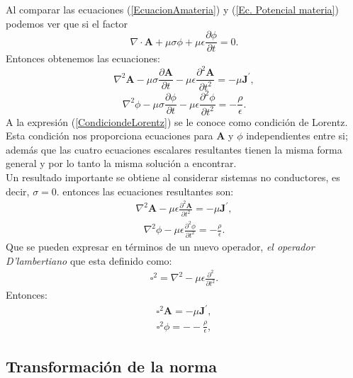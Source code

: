 \documentclass[11pt,fleqn]{book} %
\begin{document}
Al comparar las ecuaciones (\ref{EcuacionAmateria}) y (\ref{Ec. Potencial materia}) podemos ver que si el factor
\begin{equation}
\nabla\cdot\textbf{A}+\mu\sigma\phi+\mu\epsilon\frac{\partial \phi}{\partial t}=0.  \label{CondiciondeLorentz}
\end{equation}
Entonces obtenemos las ecuaciones:
\begin{equation}
\nabla^{2}\textbf{A}-\mu\sigma\frac{\partial \textbf{A}}{\partial t}-\mu\epsilon\frac{\partial^{2} \textbf{A}}{\partial t^{2}}=-\mu\textbf{J}^{'},
\end{equation}
\begin{equation}
\nabla^{2}\phi-\mu\sigma\frac{\partial \phi}{\partial t}-\mu\epsilon\frac{\partial^{2} \phi}{\partial t^{2}}=-\frac{\rho}{\epsilon}.
\end{equation}
A la expresi\'on (\ref{CondiciondeLorentz}) se le conoce como condici\'on de Lorentz. Esta condici\'on nos proporciona ecuaciones para $\textbf{A}$ y $\phi$ independientes entre si; adem\'as que las cuatro ecuaciones escalares resultantes tienen la misma forma general y por lo tanto la misma soluci\'on a encontrar.\\
Un resultado importante se obtiene al considerar sistemas no conductores, es decir, $\sigma=0$. entonces las ecuaciones resultantes son:
\begin{eqnarray*}
\nabla^{2}\textbf{A}-\mu\epsilon\frac{\partial^{2} \textbf{A}}{\partial t^{2}}=-\mu\textbf{J}^{'},
\end{eqnarray*}
\begin{eqnarray*}
\nabla^{2}\phi-\mu\epsilon\frac{\partial^{2} \phi}{\partial t^{2}}=-\frac{\rho}{\epsilon}.
\end{eqnarray*}
Que se pueden expresar en t\'erminos de un nuevo operador, \textit{el operador D'lambertiano} que esta definido como:
\begin{eqnarray*}
\square^{2}=\nabla^{2}-\mu\epsilon\frac{\partial^{2} }{\partial t^{2}}.
\end{eqnarray*}
Entonces:
\begin{eqnarray*}
\square^{2}\textbf{A}=-\mu\textbf{J}^{'},
\end{eqnarray*}
\begin{eqnarray*}
\square^{2}\phi=--\frac{\rho}{\epsilon},
\end{eqnarray*}

\subsection{Transformaci\'on de la norma}
\end{document}
